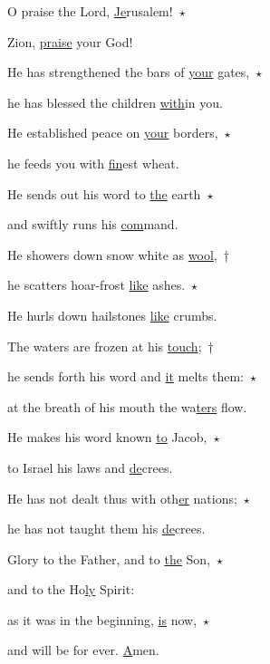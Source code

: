 \noindent O praise the Lord, \uline{Je}rusalem!~$\star$~\nopagebreak

Zion, \uline{praise} your God!

\noindent He has strengthened the bars of \uline{your} gates,~$\star$~\nopagebreak

he has blessed the children \uline{with}in you.

\noindent He established peace on \uline{your} borders,~$\star$~\nopagebreak

he feeds you with \uline{fin}est wheat.

\noindent He sends out his word to \uline{the} earth~$\star$~\nopagebreak

and swiftly runs his \uline{com}mand.

\noindent He showers down snow white as \uline{wool},~†~\nopagebreak

he scatters hoar-frost \uline{like} ashes.~$\star$~\nopagebreak

He hurls down hailstones \uline{like} crumbs.

\noindent The waters are frozen at his \uline{touch};~†~\nopagebreak

he sends forth his word and \uline{it} melts them:~$\star$~\nopagebreak

at the breath of his mouth the wa\uline{ters} flow.

\noindent He makes his word known \uline{to} Jacob,~$\star$~\nopagebreak

to Israel his laws and \uline{de}crees.

\noindent He has not dealt thus with oth\uline{er} nations;~$\star$~\nopagebreak

he has not taught them his \uline{de}crees.

\noindent Glory to the Father, and to \uline{the} Son,~$\star$~\nopagebreak

and to the Ho\uline{ly} Spirit:

\noindent as it was in the beginning, \uline{is} now,~$\star$~\nopagebreak

and will be for ever. \uline{A}men.
